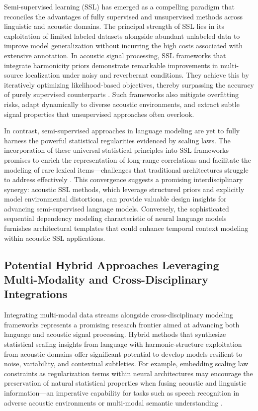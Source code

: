 \documentclass[11pt]{article}
\begin{document}
Semi-supervised learning (SSL) has emerged as a compelling paradigm that reconciles the advantages of fully supervised and unsupervised methods across linguistic and acoustic domains. The principal strength of SSL lies in its exploitation of limited labeled datasets alongside abundant unlabeled data to improve model generalization without incurring the high costs associated with extensive annotation. In acoustic signal processing, SSL frameworks that integrate harmonicity priors demonstrate remarkable improvements in multi-source localization under noisy and reverberant conditions. They achieve this by iteratively optimizing likelihood-based objectives, thereby surpassing the accuracy of purely supervised counterparts \cite{ref52}. Such frameworks also mitigate overfitting risks, adapt dynamically to diverse acoustic environments, and extract subtle signal properties that unsupervised approaches often overlook.

In contrast, semi-supervised approaches in language modeling are yet to fully harness the powerful statistical regularities evidenced by scaling laws. The incorporation of these universal statistical principles into SSL frameworks promises to enrich the representation of long-range correlations and facilitate the modeling of rare lexical items—challenges that traditional architectures struggle to address effectively \cite{ref51}. This convergence suggests a promising interdisciplinary synergy: acoustic SSL methods, which leverage structured priors and explicitly model environmental distortions, can provide valuable design insights for advancing semi-supervised language models. Conversely, the sophisticated sequential dependency modeling characteristic of neural language models furnishes architectural templates that could enhance temporal context modeling within acoustic SSL applications.

\subsection{Potential Hybrid Approaches Leveraging Multi-Modality and Cross-Disciplinary Integrations}

Integrating multi-modal data streams alongside cross-disciplinary modeling frameworks represents a promising research frontier aimed at advancing both language and acoustic signal processing. Hybrid methods that synthesize statistical scaling insights from language with harmonic-structure exploitation from acoustic domains offer significant potential to develop models resilient to noise, variability, and contextual subtleties. For example, embedding scaling law constraints as regularization terms within neural architectures may encourage the preservation of natural statistical properties when fusing acoustic and linguistic information—an imperative capability for tasks such as speech recognition in adverse acoustic environments or multi-modal semantic understanding \cite{ref51, ref52}.
\end{document}
